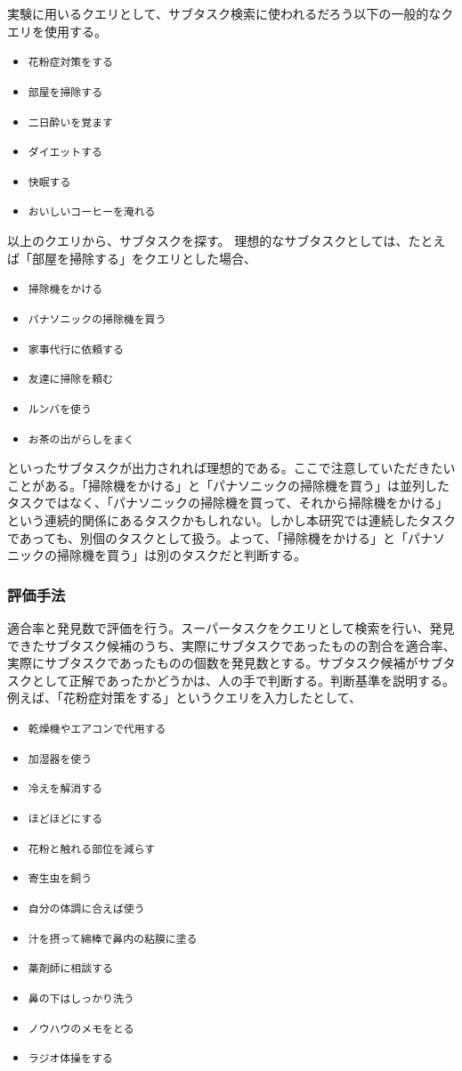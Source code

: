 \documentclass[submit,techreq]{ipsj}
\def\|{\verb|}
\begin{document}
実験に用いるクエリとして、サブタスク検索に使われるだろう以下の一般的なクエリを使用する。

\begin{itemize}
\item \|花粉症対策をする|
\item \|部屋を掃除する|
\item \|二日酔いを覚ます|
\item \|ダイエットする|
\item \|快眠する|
\item \|おいしいコーヒーを淹れる|
\end{itemize}


以上のクエリから、サブタスクを探す。
理想的なサブタスクとしては、たとえば「部屋を掃除する」をクエリとした場合、

\begin{itemize}
\item \|掃除機をかける|
\item \|パナソニックの掃除機を買う|
\item \|家事代行に依頼する|
\item \|友達に掃除を頼む|
\item \|ルンバを使う|
\item \|お茶の出がらしをまく|
\end{itemize}

といったサブタスクが出力されれば理想的である。ここで注意していただきたいことがある。「掃除機をかける」と「パナソニックの掃除機を買う」は並列したタスクではなく、「パナソニックの掃除機を買って、それから掃除機をかける」という連続的関係にあるタスクかもしれない。しかし本研究では連続したタスクであっても、別個のタスクとして扱う。よって、「掃除機をかける」と「パナソニックの掃除機を買う」は別のタスクだと判断する。


\subsubsection{評価手法}
適合率と発見数で評価を行う。スーパータスクをクエリとして検索を行い、発見できたサブタスク候補のうち、実際にサブタスクであったものの割合を適合率、実際にサブタスクであったものの個数を発見数とする。サブタスク候補がサブタスクとして正解であったかどうかは、人の手で判断する。判断基準を説明する。例えば、「花粉症対策をする」というクエリを入力したとして、

\begin{itemize}
\item \|乾燥機やエアコンで代用する|
\item \|加湿器を使う|
\item \|冷えを解消する|
\item \|ほどほどにする|
\item \|花粉と触れる部位を減らす|
\item \|寄生虫を飼う|
\item \|自分の体調に合えば使う|
\item \|汁を摂って綿棒で鼻内の粘膜に塗る|
\item \|薬剤師に相談する|
\item \|鼻の下はしっかり洗う|
\item \|ノウハウのメモをとる|
\item \|ラジオ体操をする|
\end{itemize}
\end{document}
